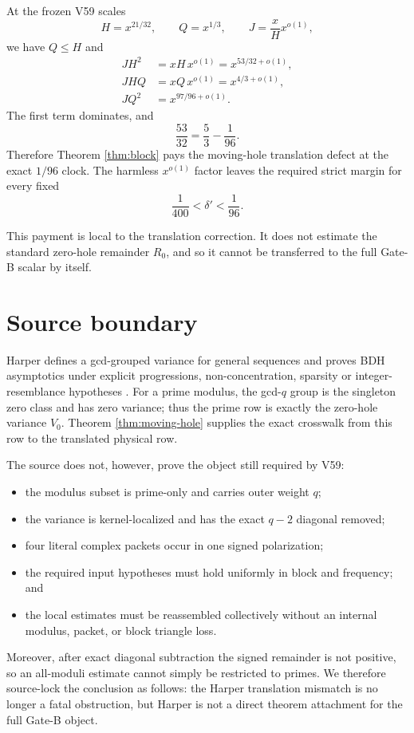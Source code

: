 \documentclass[11pt]{article}
\begin{document}
At the frozen V59 scales
\[
 H=x^{21/32},\qquad Q=x^{1/3},\qquad
 J=\frac{x}{H}x^{o(1)},
\]
we have $Q\le H$ and
\begin{align*}
 JH^2&=xH\,x^{o(1)}=x^{53/32+o(1)},\\
 JHQ&=xQ\,x^{o(1)}=x^{4/3+o(1)},\\
 JQ^2&=x^{97/96+o(1)}.
\end{align*}
The first term dominates, and
\begin{equation}\label{eq:critical-clock}
 \frac{53}{32}=\frac53-\frac1{96}.
\end{equation}
Therefore Theorem \ref{thm:block} pays the moving-hole translation defect at
the exact $1/96$ clock.  The harmless $x^{o(1)}$ factor leaves the required
strict margin for every fixed
\begin{equation}\label{eq:strict-saving}
 \frac1{400}<\delta'<\frac1{96}.
\end{equation}

This payment is local to the translation correction.  It does not estimate
the standard zero-hole remainder $R_0$, and so it cannot be transferred to
the full Gate-B scalar by itself.

\section{Source boundary}

Harper defines a gcd-grouped variance for general sequences and proves BDH
asymptotics under explicit progressions, non-concentration, sparsity or
integer-resemblance hypotheses \cite{Harper2024}.  For a prime modulus, the
gcd-$q$ group is the singleton zero class and has zero variance; thus the
prime row is exactly the zero-hole variance $V_0$.  Theorem
\ref{thm:moving-hole} supplies the exact crosswalk from this row to the
translated physical row.

The source does not, however, prove the object still required by V59:
\begin{itemize}[leftmargin=2em]
 \item the modulus subset is prime-only and carries outer weight $q$;
 \item the variance is kernel-localized and has the exact $q-2$ diagonal
       removed;
 \item four literal complex packets occur in one signed polarization;
 \item the required input hypotheses must hold uniformly in block and
       frequency; and
 \item the local estimates must be reassembled collectively without an
       internal modulus, packet, or block triangle loss.
\end{itemize}
Moreover, after exact diagonal subtraction the signed remainder is not
positive, so an all-moduli estimate cannot simply be restricted to primes.
We therefore source-lock the conclusion as follows: the Harper translation
mismatch is no longer a fatal obstruction, but Harper is not a direct theorem
attachment for the full Gate-B object.
\end{document}
